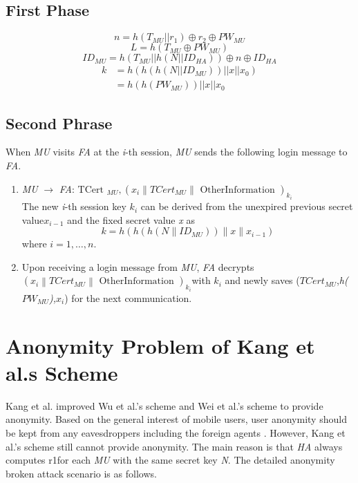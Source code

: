 \documentclass{article}
\begin{document}
\subsection{First Phase}
    \begin{equation}
        n = h(T_{MU}||r_{1}) \oplus r_{2} \oplus PW_{MU}
    \end{equation}
    \begin{equation}
        L = h(T_{MU} \oplus PW_{MU})
    \end{equation}
    \begin{equation}
        ID_{MU} = h(T_{MU}||h(N|| ID_{HA}))\oplus n \oplus ID_{HA}
    \end{equation}    
   \begin{equation}
    \begin{aligned}
        k & = h(h(h(N||ID_{MU}))||x||x_{0}) \\
          & = h(h(PW_{MU}))||x||x_{0}
    \end{aligned}         
    \end{equation}
\subsection{Second Phrase}
\noindent When \emph{MU} visits \emph{FA} at the \emph{i}-th session, \emph{MU} sends the following 
login message to \emph{FA}.
\begin{enumerate}
    \item \emph{MU} $\rightarrow$ \emph{FA}:$\text { TCert }_{M U},\left(x_{i}\left\|T C e r t_{M U}\right\| \text { OtherInformation }\right)_{k_{i}}$\\
    The new \emph{i}-th session key \emph{$k_i$} can be derived from the unexpired previous secret 
value\emph{$x_{i-1}$} and the fixed secret value \emph{x} as%
    \begin{equation}
        k=h\left(h\left(h\left(N \| I D_{M U}\right)\right)\|x\| x_{i-1}\right)
    \end{equation}
    where $i = 1,\ldots,n$.
    \item Upon receiving a login message from \emph{MU}, \emph{FA} decrypts $\left(x_{i}\left\|T C e r t_{M U}\right\| \text { OtherInformation }\right)_{k_{i}}$with $k_{i}$ and newly saves ($TCert_{MU}$,\emph{h($PW_{MU}$),$x_i$}) for the next communication.
\end{enumerate}

\section {Anonymity Problem of Kang et al.s Scheme}
\noindent Kang et al. \cite{ZYan122} improved Wu et al.’s scheme \cite{Lohr10} and Wei et al.’s scheme \cite{Ateniese11} to provide anonymity. 
Based on the general interest of mobile users, user anonymity should be kept from any eavesdroppers including 
the foreign agents \cite{Barsoum11}. However, Kang et al.’s scheme still cannot provide anonymity. The main reason is that 
\emph{HA} always computes r1for each \emph{MU} with the same secret key \emph{N}. The detailed 
anonymity broken attack scenario is as follows.
\end{document}
